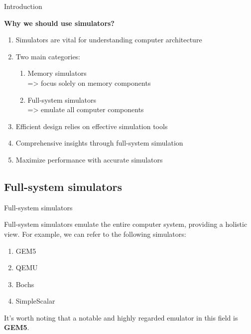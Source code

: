 \documentclass{beamer}
\begin{document}
\begin{frame}{Introduction}
	
	\textbf{Why we should use simulators?}
	
	\begin{enumerate}
		\item Simulators are vital for understanding computer architecture
		\item Two main categories: 
		\begin{enumerate}
			\item Memory simulators\\ => focus solely on memory components
			\item Full-system simulators \\ => emulate all computer components
		\end{enumerate}
		\item Efficient design relies on effective simulation tools
		\item Comprehensive insights through full-system simulation
		\item Maximize performance with accurate simulators
	\end{enumerate}
	
	
%	
%	
	
\end{frame}



\subsection{Full-system simulators}

\begin{frame}{Full-system simulators}
	
	Full-system simulators emulate the entire computer system, providing a holistic view. For example, we can refer to the following simulators:
	\begin{enumerate}
		\item GEM5
		\item QEMU
		\item Bochs
		\item SimpleScalar
	\end{enumerate}
	
	It's worth noting that a notable and highly regarded emulator in this field is \textbf{GEM5}.
	
\end{frame}
\end{document}
